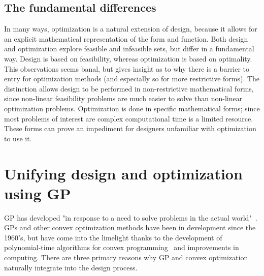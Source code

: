 \subsection{The fundamental differences}

In many ways, optimization is a natural extension of design, because it allows
for an explicit mathematical representation of the form and function. Both design and
optimization explore feasible and infeasible sets, but differ in a fundamental way.
Design is based on feasibility, whereas optimization is based on optimality.
This observations seems banal, but gives insight as to why there is a barrier
to entry for optimization methods (and especially so for more restrictive forms).
The distinction allows design to be performed
in non-restrictive mathematical forms, since non-linear feasibility problems are
much easier to solve than non-linear optimization problems. Optimization is
done in specific mathematical forms; since most problems of interest are complex
computational time is a limited resource. These forms can prove
an impediment for designers unfamiliar with optimization to use it.

\section{Unifying design and optimization using \gls{GP}}

\gls{GP} has developed "in response to a need to solve problems in the actual 
world"~\cite{duffingp}. \gls{GP}s and other convex optimization methods have been
in development since the 1960's, but have come into the limelight thanks to the development of
polynomial-time algorithms for convex programming~\cite{interior_point} and
improvements in computing. There are three primary reasons why \gls{GP} and convex
optimization naturally integrate into the design process.

